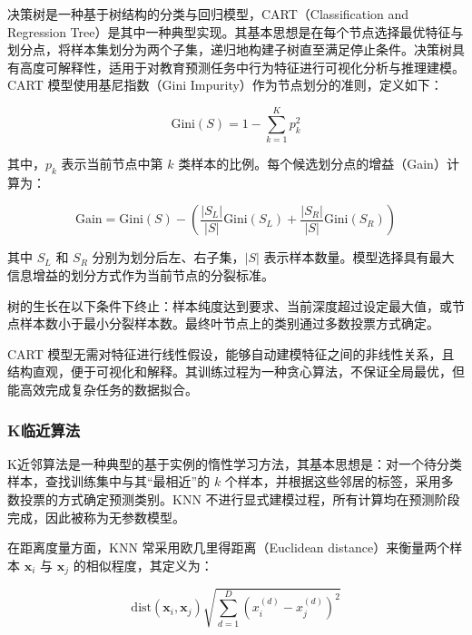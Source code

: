 \documentclass[a4paper, utf8]{ctexart}
\begin{document}
	决策树是一种基于树结构的分类与回归模型，CART（Classification and Regression Tree）是其中一种典型实现。\cite{ref23}其基本思想是在每个节点选择最优特征与划分点，将样本集划分为两个子集，递归地构建子树直至满足停止条件。决策树具有高度可解释性，适用于对教育预测任务中行为特征进行可视化分析与推理建模\cite{ref15,ref16}。CART 模型使用基尼指数（Gini Impurity）作为节点划分的准则，定义如下：
	
	\vspace{-.5em}
	\begin{equation}
		\text{Gini}(S)=1-\sum^K_{k=1}p^2_k
	\end{equation}
	
	其中，$p_k$ 表示当前节点中第 $k$ 类样本的比例。每个候选划分点的增益（Gain）计算为：
	
	\vspace{-.5em}
	\begin{equation}
		\text{Gain}=\text{Gini}(S)-\left( \frac{\left| S_L \right|}{\left| S \right|}\text{Gini}(S_L) + \frac{\left| S_R \right|}{\left| S \right|}\text{Gini}(S_R) \right)
	\end{equation}
	
	其中 $S_L$ 和 $S_R$ 分别为划分后左、右子集，$|S|$ 表示样本数量。模型选择具有最大信息增益的划分方式作为当前节点的分裂标准。
	
	树的生长在以下条件下终止：样本纯度达到要求、当前深度超过设定最大值，或节点样本数小于最小分裂样本数。最终叶节点上的类别通过多数投票方式确定。
	
	CART 模型无需对特征进行线性假设，能够自动建模特征之间的非线性关系，且结构直观，便于可视化和解释。其训练过程为一种贪心算法，不保证全局最优，但能高效完成复杂任务的数据拟合。
	
	\subsubsection{K临近算法}
	
	K近邻算法是一种典型的基于实例的惰性学习方法，其基本思想是：对一个待分类样本，查找训练集中与其“最相近”的 $k$ 个样本，并根据这些邻居的标签，采用多数投票的方式确定预测类别。KNN 不进行显式建模过程，所有计算均在预测阶段完成，因此被称为无参数模型。\cite{ref8,ref19}
	
	在距离度量方面，KNN 常采用欧几里得距离（Euclidean distance）来衡量两个样本 $\mathbf{x}_i$ 与 $\mathbf{x}_j$ 的相似程度，其定义为：
	
	\vspace{-.5em}
	\begin{equation}
		\text{dist}(\mathbf{x}_i,\mathbf{x}_j)\sqrt{\sum^{D}_{d=1}\left( x_i^{(d)}-x_j^{(d)} \right)^2}
	\end{equation}
	
\end{document}
